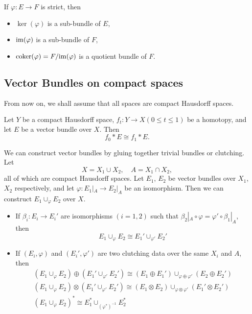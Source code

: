 \begin{proposition}
    If $\varphi:E\to F$ is strict, then 
    \begin{itemize}
        \item $\ker(\varphi)$ is a sub-bundle of $E$,
        \item $\mathrm{im}(\varphi)$ is a sub-bundle of $F$,
        \item $\mathrm{coker}(\varphi)=F/\mathrm{im}(\varphi)$ is a quotient bundle of $F$.
    \end{itemize}
\end{proposition}

\subsection{Vector Bundles on compact spaces}
From now on, we shall assume that all spaces are compact Hausdorff spaces. 

\begin{lemma}
    Let $Y$ be a compact Hausdorff space, $f_t:Y\to X(0\leq t\leq 1)$ be a
    homotopy, and let $E$ be a vector bundle over $X$. Then
    \[
    f_0*E\cong f_1*E.
    \]
\end{lemma} 

We can construct vector bundles by gluing together trivial bundles or clutching.
Let 
\[
X=X_1\cup X_2,\quad A=X_1\cap X_2,
\]
all of which are compact Hausdorff spaces. Let $E_1$, $E_2$ be vector bundles
over $X_1$, $X_2$ respectively, and let $\varphi:E_1|_A\to E_2|_A$ be an isomorphism. 
Then we can construct $E_1\cup_\varphi E_2$ over $X$. 

\begin{proposition}
    \begin{itemize}
        \item If $\beta_i:E_i\to E_i'$ are isomorphisms $(i=1,2)$ such that 
        $\beta_2|_A\circ\varphi=\varphi'\circ\beta_1|_A$, then 
        \[
        E_1\cup_{\varphi} E_2\cong E_1'\cup_{\varphi'} E_2'
        \]
        \item If $(E_i,\varphi)$ and $(E_i',\varphi')$ are two clutching data
        over the same $X_i$ and $A$, then 
        \begin{gather*}
        (E_1\cup_{\varphi} E_2)\oplus (E_1'\cup_{\varphi'} E_2')\cong 
        (E_1\oplus E_1')\cup_{\varphi\oplus\varphi'}(E_2\oplus E_2') \\
        (E_1\cup_{\varphi} E_2)\otimes (E_1'\cup_{\varphi'} E_2')\cong 
        (E_1\otimes E_2)\cup_{\varphi\otimes\varphi'}(E_1'\otimes E_2') \\
        (E_1\cup_{\varphi} E_2)^*\cong E_1^*\cup_{(\varphi^*)^{-1}} E_2^*
        \end{gather*}
    \end{itemize}
\end{proposition}

